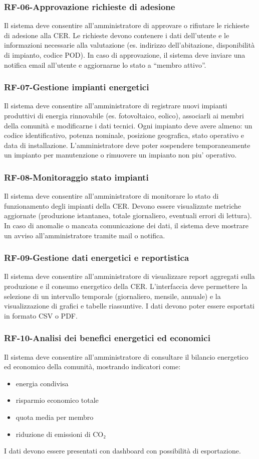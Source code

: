 \subsubsection*{RF-06-Approvazione richieste di adesione}
Il sistema deve consentire all’amministratore di approvare o rifiutare le richieste di adesione alla CER. Le richieste devono contenere i dati dell’utente e le informazioni necessarie alla valutazione (es. indirizzo dell’abitazione, disponibilità di impianto, codice POD). In caso di approvazione, il sistema deve inviare una notifica email all’utente e aggiornarne lo stato a “membro attivo”.
\subsubsection*{RF-07-Gestione impianti energetici}
Il sistema deve consentire all’amministratore di registrare nuovi impianti produttivi di energia rinnovabile (es. fotovoltaico, eolico), associarli ai membri della comunità e modificarne i dati tecnici. Ogni impianto deve avere almeno: un codice identificativo, potenza nominale, posizione geografica, stato operativo e data di installazione. L’amministratore deve poter sospendere temporaneamente un impianto per manutenzione o rimuovere un impianto non piu' operativo.
\subsubsection*{RF-08-Monitoraggio stato impianti}
Il sistema deve consentire all’amministratore di monitorare lo stato di funzionamento degli impianti della CER. Devono essere visualizzate metriche aggiornate (produzione istantanea, totale giornaliero, eventuali errori di lettura). In caso di anomalie o mancata comunicazione dei dati, il sistema deve mostrare un avviso all’amministratore tramite mail o notifica.
\subsubsection*{RF-09-Gestione dati energetici e reportistica}
Il sistema deve consentire all’amministratore di visualizzare report aggregati sulla produzione e il consumo energetico della CER. L’interfaccia deve permettere la selezione di un intervallo temporale (giornaliero, mensile, annuale) e la visualizzazione di grafici e tabelle riassuntive. I dati devono poter essere esportati in formato CSV o PDF.
\subsubsection*{RF-10-Analisi dei benefici energetici ed economici}
Il sistema deve consentire all’amministratore di consultare il bilancio energetico ed economico della comunità, mostrando indicatori come:
\begin{itemize}
    \item energia condivisa
    \item risparmio economico totale
    \item quota media per membro
    \item riduzione di emissioni di CO₂
\end{itemize}
I dati devono essere presentati con dashboard con possibilità di esportazione.
